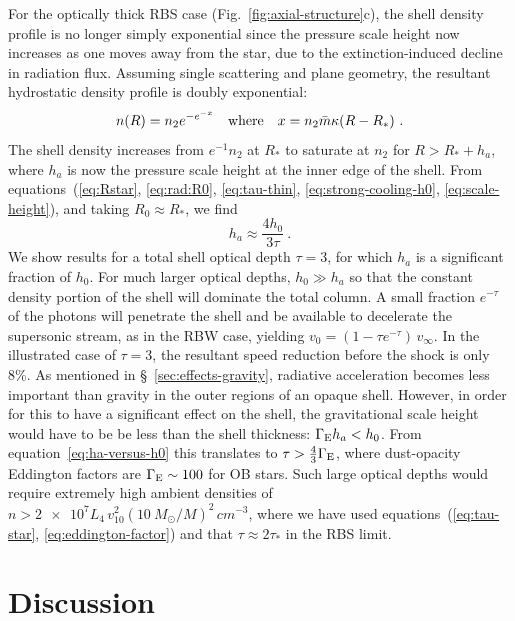 For the optically thick RBS case (Fig.~\ref{fig:axial-structure}c),
the shell density profile is no longer simply exponential since the
pressure scale height now increases as one moves away from the star,
due to the extinction-induced decline in radiation flux. Assuming
single scattering and plane geometry, the resultant hydrostatic
density profile is doubly exponential:
\begin{equation}
  \label{eq:rbs-density-profile}
  n(R) = n_2 e^{-e^{-x}} \text{\quad where\quad } x = n_2 \bar{m} \kappa (R - R_*) \ . 
\end{equation}
The shell density increases from \(e^{-1} n_2\) at \(R_*\) to saturate
at \(n_2\) for \(R > R_* + h_a\), where \(h_a\) is now the pressure
scale height at the inner edge of the shell.  From
equations~(\ref{eq:Rstar}, \ref{eq:rad:R0}, \ref{eq:tau-thin},
\ref{eq:strong-cooling-h0}, \ref{eq:scale-height}), and taking \(R_0 \approx R_*\), we find
\begin{equation}
  \label{eq:ha-versus-h0}
  h_a \approx \frac{4 h_0}{3 \tau} \ .
\end{equation}
We show results for a total shell optical depth \(\tau = 3\), for which
\(h_a\) is a significant fraction of \(h_0\).  For much larger optical
depths, \(h_0 \gg h_a\) so that the constant density portion of the
shell will dominate the total column.  A small fraction \(e^{-\tau}\) of
the photons will penetrate the shell and be available to decelerate
the supersonic stream, as in the RBW case, yielding
\(v_0 = (1 - \tau e^{-\tau})\, v_\infty\).  In the illustrated case of
\(\tau = 3\), the resultant speed reduction before the shock is only 8\%.
As mentioned in \S~\ref{sec:effects-gravity}, radiative acceleration
becomes less important than gravity in the outer regions of an opaque
shell.  However, in order for this to have a significant effect on the
shell, the gravitational scale height would have to be be less than
the shell thickness: \(\Gamma_{\text{E}} h_a < h_0\).  From
equation~\eqref{eq:ha-versus-h0} this translates to
\(\tau > \frac43 \Gamma_{\text{E}}\), where dust-opacity Eddington factors are
\(\Gamma_{\text{E}} \sim 100\) for OB stars.  Such large optical depths would
require extremely high ambient densities of
\(n > \num{2e7} L_4 \,v_{10}^2 \left( \SI{10}{M_\odot}/M \right)^2 \,
\si{cm^{-3}} \), where we have used equations~(\ref{eq:tau-star},
\ref{eq:eddington-factor}) and that \(\tau \approx 2\tau_*\) in the RBS limit.

\section{Discussion}
\label{sec:discussion}

